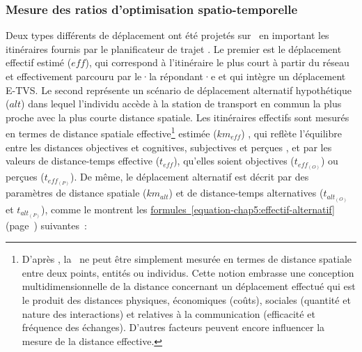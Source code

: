 \begin{refsegment}
\subsubsection*{Mesure des ratios d'optimisation spatio-temporelle
    \label{chap5:calcul-ratio-optimisation}
    }

Deux types différents de déplacement ont été projetés sur ~en important les itinéraires fournis par le planificateur de trajet . Le premier est le déplacement effectif estimé (\(eff\)), qui correspond à l'itinéraire le plus court à partir du réseau et effectivement parcouru par le·la répondant·e et qui intègre un déplacement \acrshort{E-TVS}. Le second représente un scénario de déplacement alternatif hypothétique (\(alt\)) dans lequel l'individu accède à la station de transport en commun la plus proche avec la plus courte distance spatiale. Les itinéraires effectifs sont mesurés en termes de distance spatiale effective\footnote{
    D'après \textcolor{blue}{\textcite[308]{deutsch_note_1961}}, la ~ne peut être simplement mesurée en termes de distance spatiale entre deux points, entités ou individus. Cette notion embrasse une conception multidimensionnelle de la distance concernant un déplacement effectué qui est le produit des distances physiques, économiques (coûts), sociales (quantité et nature des interactions) et relatives à la communication (efficacité et fréquence des échanges). D'autres facteurs peuvent encore influencer la mesure de la distance effective.
} estimée (\(km_{eff}\)) \textcolor{blue}{\autocite[34]{cauvin-reymond_perception_1984}}, qui reflète l'équilibre entre les distances objectives \textcolor{blue}{\autocite{brigss_methodologies_1976}} et cognitives, subjectives et perçues \textcolor{blue}{\autocite{canter_psychology_1977, bailly_perception_1977, sadalla_perception_1980}}, et par les valeurs de distance-temps effective (\(t_{eff}\)), qu'elles soient objectives (\(t_{eff_{(O)}}\)) ou perçues (\(t_{eff_{(P)}}\)). De même, le déplacement alternatif est décrit par des paramètres de distance spatiale (\(km_{alt}\)) et de distance-temps alternatives (\(t_{alt_{(O)}}\) et \(t_{alt_{(P)}}\)), comme le montrent les \hyperref[equation-chap5:effectif-alternatif]{formules~\ref{equation-chap5:effectif-alternatif}} (page~\pageref{equation-chap5:effectif-alternatif}) suivantes~:%


\end{refsegment}
